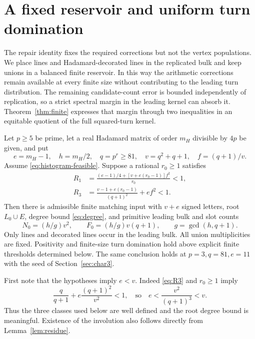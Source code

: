 \section{A fixed reservoir and uniform turn domination}\label{sec:reservoir}
The repair identity fixes the required corrections but not the vertex populations. We place lines and Hadamard-decorated lines in the replicated bulk and keep unions in a balanced finite reservoir. In this way the arithmetic corrections remain available at every finite size without contributing to the leading turn distribution. The remaining candidate-count error is bounded independently of replication, so a strict spectral margin in the leading kernel can absorb it. Theorem~\ref{thm:finite} expresses that margin through two inequalities in an equitable quotient of the full squared-turn kernel.

\begin{theorem}\label{thm:finite}
Let $p\ge5$ be prime, let a real Hadamard matrix of order $m_H$ divisible by $4p$ be given, and put
\[
 e=m_H-1,\quad h=m_H/2,\quad q=p^r\ge81,\quad
 v=q^2+q+1,\quad f=(q+1)/v.
\]
Assume \eqref{eq:histogram-feasible}. Suppose a rational $r_0\ge1$ satisfies
\begin{align}
 R_1&=\frac{(e-1)/4+[v+e(r_0-1)]f^2}{r_0}<1,\label{eq:R1}\\
 R_3&=\frac{v-1+e(r_0-1)}{(q+1)^2}+ef^2<1.\label{eq:R3}
\end{align}
Then there is admissible finite matching input with $v+e$ signed letters, root $L_0\cup E$, degree bound \eqref{eq:degree}, and primitive leading bulk and slot counts
\begin{equation}\label{eq:core-totals}
 N_0=(h/g)v^2,\qquad F_0=(h/g)v(q+1),\qquad g=\gcd(h,q+1).
\end{equation}
Only lines and decorated lines occur in the leading bulk. All union multiplicities are fixed. Positivity and finite-size turn domination hold above explicit finite thresholds determined below. The same conclusion holds at $p=3,q=81,e=11$ with the seed of Section~\ref{sec:char3}.
\end{theorem}

First note that the hypotheses imply $e<v$. Indeed \eqref{eq:R3} and $r_0\ge1$ imply
\[
 \frac{q}{q+1}+e\frac{(q+1)^2}{v^2}<1,
 \quad\text{so}\quad e<\frac{v^2}{(q+1)^3}<v.
\]
Thus the three classes used below are well defined and the root degree bound is meaningful. Existence of the involution also follows directly from Lemma~\ref{lem:residue}.

